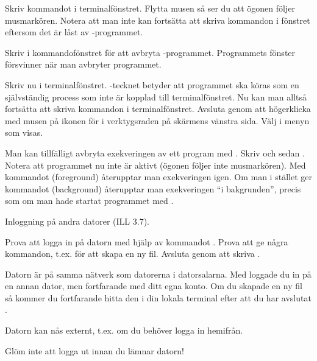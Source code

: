 \begin{Datorarbete}
	\begin{Deluppgifter}
		\item Skriv kommandot  i terminalfönstret. Flytta musen så ser du att ögonen följer musmarkören. Notera att man inte kan fortsätta att skriva kommandon i fönstret eftersom det är låst av -programmet.
		\item Skriv  i kommandofönstret för att avbryta -programmet. Programmets fönster försvinner när man avbryter programmet.
		\item Skriv nu  i terminalfönstret. \code{\&}-tecknet betyder att programmet ska köras som en självständig process som inte är kopplad till terminalfönstret. Nu kan man alltså fortsätta att skriva kommandon i terminalfönstret. Avsluta  genom att högerklicka med musen på ikonen för  i verktygsraden på skärmens vänstra sida. Välj  i menyn som visas.
		\item Man kan tillfälligt avbryta exekveringen av ett program med . Skriv  och sedan . Notera att programmet nu inte är aktivt (ögonen följer inte musmarkören). Med kommandot  (foreground) återupptar man exekveringen igen. Om man i stället ger kommandot  (background) återupptar man exekveringen ``i bakgrunden'', precis som om man hade startat programmet med .
	\end{Deluppgifter}

	\item Inloggning på andra datorer (ILL 3.7).

	\begin{Deluppgifter}
		\item Prova att logga in på datorn  med hjälp av kommandot . Prova att ge några kommandon, t.ex.  för att skapa en ny fil. Avsluta genom att skriva \code{exit}.
		\item Datorn  är på samma nätverk som datorerna i datorsalarna. Med  loggade du in på en annan dator, men fortfarande med ditt egna konto. Om du skapade en ny fil så kommer du fortfarande hitta den i din lokala terminal efter att du har avslutat \code{ssh}.
		\item Datorn  kan nås externt, t.ex. om du behöver logga in hemifrån.
	\end{Deluppgifter}

	\item Glöm inte att logga ut innan du lämnar datorn!
\end{Datorarbete}